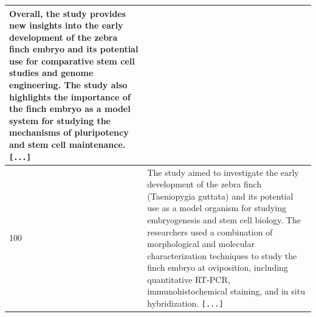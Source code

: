 \begin{table}[]
\begin{tabular}{l|p{}}
Overall, the study provides new insights into the early development of the zebra finch embryo and its potential use for comparative stem cell studies and genome engineering. The study also highlights the importance of the finch embryo as a model system for studying the mechanisms of pluripotency and stem cell maintenance.  \texttt{[...]}
\\ \hline
100 & The study aimed to investigate the early development of the zebra finch (Taeniopygia guttata) and its potential use as a model organism for studying embryogenesis and stem cell biology. The researchers used a combination of morphological and molecular characterization techniques to study the finch embryo at oviposition, including quantitative RT-PCR, immunohistochemical staining, and in situ hybridization.  \texttt{[...]}

\end{tabular}
\end{table}
